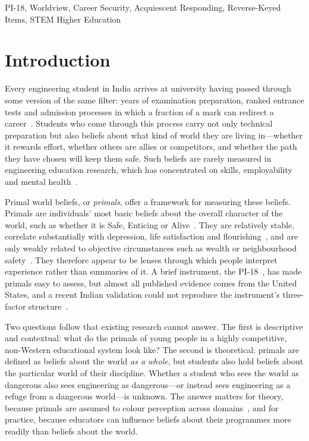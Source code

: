 \documentclass[journal,a4paper]{IEEEtran}
\begin{document}
\begin{IEEEkeywords}
PI-18, Worldview, Career Security, Acquiescent Responding, Reverse-Keyed Items, STEM Higher Education
\end{IEEEkeywords}

\section{Introduction}

Every engineering student in India arrives at university having passed through some version of the same filter: years of examination preparation, ranked entrance tests and admission processes in which a fraction of a mark can redirect a career~\cite{pienyu2024,subramanian2019}. Students who come through this process carry not only technical preparation but also beliefs about what kind of world they are living in—whether it rewards effort, whether others are allies or competitors, and whether the path they have chosen will keep them safe. Such beliefs are rarely measured in engineering education research, which has concentrated on skills, employability and mental health~\cite{blom2011,loyalka2021}.

Primal world beliefs, or \emph{primals}, offer a framework for measuring these beliefs. Primals are individuals' most basic beliefs about the overall character of the world, such as whether it is Safe, Enticing or Alive~\cite{clifton2019}. They are relatively stable, correlate substantially with depression, life satisfaction and flourishing~\cite{cliftonyaden2021}, and are only weakly related to objective circumstances such as wealth or neighbourhood safety~\cite{kerry2024}. They therefore appear to be lenses through which people interpret experience rather than summaries of it. A brief instrument, the PI-18~\cite{cliftonyaden2021}, has made primals easy to assess, but almost all published evidence comes from the United States, and a recent Indian validation could not reproduce the instrument's three-factor structure~\cite{bhatnagar2024}.

Two questions follow that existing research cannot answer. The first is descriptive and contextual: what do the primals of young people in a highly competitive, non-Western educational system look like? The second is theoretical: primals are defined as beliefs about the world \emph{as a whole}, but students also hold beliefs about the particular world of their discipline. Whether a student who sees the world as dangerous also sees engineering as dangerous—or instead sees engineering as a refuge from a dangerous world—is unknown. The answer matters for theory, because primals are assumed to colour perception across domains~\cite{clifton2019}, and for practice, because educators can influence beliefs about their programmes more readily than beliefs about the world.
\end{document}
